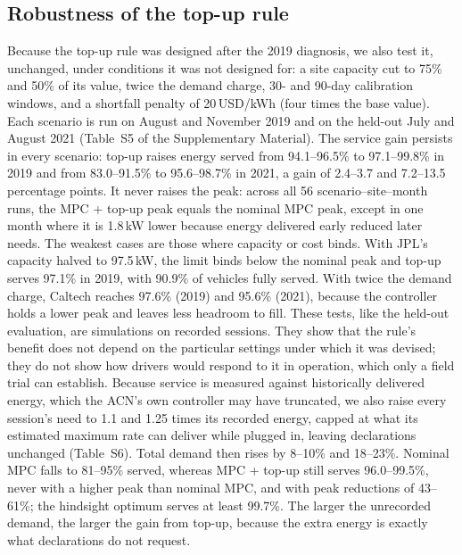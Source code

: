

\subsection{Robustness of the top-up rule}\label{sec:res:topuprob}
Because the top-up rule was designed after the 2019 diagnosis, we also test it, unchanged, under conditions it was not designed for: a site capacity cut to 75\% and 50\% of its value, twice the demand charge, 30- and 90-day calibration windows, and a shortfall penalty of 20\,USD/kWh (four times the base value). Each scenario is run on August and November 2019 and on the held-out July and August 2021 (Table~S5 of the Supplementary Material).
The service gain persists in every scenario: top-up raises energy served from 94.1--96.5\% to 97.1--99.8\% in 2019 and from 83.0--91.5\% to 95.6--98.7\% in 2021, a gain of 2.4--3.7 and 7.2--13.5 percentage points. It never raises the peak: across all 56 scenario--site--month runs, the MPC + top-up peak equals the nominal MPC peak, except in one month where it is 1.8\,kW lower because energy delivered early reduced later needs. The weakest cases are those where capacity or cost binds. With JPL's capacity halved to 97.5\,kW, the limit binds below the nominal peak and top-up serves 97.1\% in 2019, with 90.9\% of vehicles fully served. With twice the demand charge, Caltech reaches 97.6\% (2019) and 95.6\% (2021), because the controller holds a lower peak and leaves less headroom to fill. These tests, like the held-out evaluation, are simulations on recorded sessions. They show that the rule's benefit does not depend on the particular settings under which it was devised; they do not show how drivers would respond to it in operation, which only a field trial can establish. Because service is measured against historically delivered energy, which the ACN's own controller may have truncated, we also raise every session's need to 1.1 and 1.25 times its recorded energy, capped at what its estimated maximum rate can deliver while plugged in, leaving declarations unchanged (Table~S6). Total demand then rises by 8--10\% and 18--23\%. Nominal MPC falls to 81--95\% served, whereas MPC + top-up still serves 96.0--99.5\%, never with a higher peak than nominal MPC, and with peak reductions of 43--61\%; the hindsight optimum serves at least 99.7\%. The larger the unrecorded demand, the larger the gain from top-up, because the extra energy is exactly what declarations do not request.


